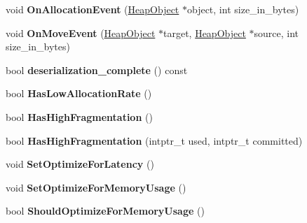 \begin{DoxyCompactItemize}
\item 
void {\bfseries On\+Allocation\+Event} (\hyperlink{classv8_1_1internal_1_1_heap_object}{Heap\+Object} $\ast$object, int size\+\_\+in\+\_\+bytes)\hypertarget{classv8_1_1internal_1_1_heap_a544094daeb4e49f2be37c457e9f1a0b3}{}\label{classv8_1_1internal_1_1_heap_a544094daeb4e49f2be37c457e9f1a0b3}

\item 
void {\bfseries On\+Move\+Event} (\hyperlink{classv8_1_1internal_1_1_heap_object}{Heap\+Object} $\ast$target, \hyperlink{classv8_1_1internal_1_1_heap_object}{Heap\+Object} $\ast$source, int size\+\_\+in\+\_\+bytes)\hypertarget{classv8_1_1internal_1_1_heap_ac444266997bec9db737f316351eb9690}{}\label{classv8_1_1internal_1_1_heap_ac444266997bec9db737f316351eb9690}

\item 
bool {\bfseries deserialization\+\_\+complete} () const \hypertarget{classv8_1_1internal_1_1_heap_a596d2156994932d846dd9fe993ffa5d2}{}\label{classv8_1_1internal_1_1_heap_a596d2156994932d846dd9fe993ffa5d2}

\item 
bool {\bfseries Has\+Low\+Allocation\+Rate} ()\hypertarget{classv8_1_1internal_1_1_heap_aa7deecdcb6c6f8c6bc7c92c2f1693633}{}\label{classv8_1_1internal_1_1_heap_aa7deecdcb6c6f8c6bc7c92c2f1693633}

\item 
bool {\bfseries Has\+High\+Fragmentation} ()\hypertarget{classv8_1_1internal_1_1_heap_a8368bf50d73656c6df28dd1e80205049}{}\label{classv8_1_1internal_1_1_heap_a8368bf50d73656c6df28dd1e80205049}

\item 
bool {\bfseries Has\+High\+Fragmentation} (intptr\+\_\+t used, intptr\+\_\+t committed)\hypertarget{classv8_1_1internal_1_1_heap_a4b85621e24e6871adc08ae2f5f9c4b81}{}\label{classv8_1_1internal_1_1_heap_a4b85621e24e6871adc08ae2f5f9c4b81}

\item 
void {\bfseries Set\+Optimize\+For\+Latency} ()\hypertarget{classv8_1_1internal_1_1_heap_a3b921a72f6ae7df8ca89fe8091f1e4a8}{}\label{classv8_1_1internal_1_1_heap_a3b921a72f6ae7df8ca89fe8091f1e4a8}

\item 
void {\bfseries Set\+Optimize\+For\+Memory\+Usage} ()\hypertarget{classv8_1_1internal_1_1_heap_ab82991aad88521cb000718fa356f7b83}{}\label{classv8_1_1internal_1_1_heap_ab82991aad88521cb000718fa356f7b83}

\item 
bool {\bfseries Should\+Optimize\+For\+Memory\+Usage} ()\hypertarget{classv8_1_1internal_1_1_heap_ad2128865e219ddb70695e23563141da9}{}\label{classv8_1_1internal_1_1_heap_ad2128865e219ddb70695e23563141da9}


\end{DoxyCompactItemize}
